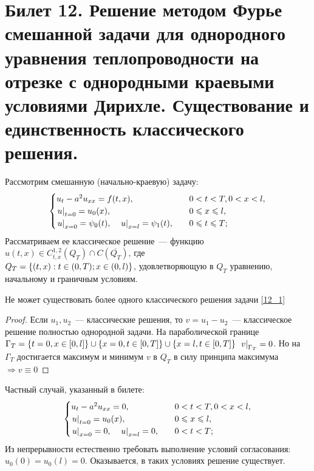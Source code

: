 \section{Билет 12. Решение методом Фурье смешанной задачи для однородного уравнения теплопроводности на отрезке с однородными краевыми условиями Дирихле. Существование и единственность классического решения.}
Рассмотрим смешанную (начально-краевую) задачу:
\begin{equation} \label{12_1}
	\begin{cases}
		u_t - a^2u_{xx} = f(t,x), \quad &0 < t < T, 0 < x < l, \\
		\left. u\right|_{t=0} = u_0(x), \quad & 0 \leqslant x \leqslant l, \\
		\left. u\right|_{x=0} = \psi_0(t), \quad \left. u\right|_{x=l} = \psi_1(t), \quad & 0 \leqslant t \leqslant T;
	\end{cases}
\end{equation}
Рассматриваем ее классическое решение~--- функцию $u(t,x) \in C^{1,2}_{t,x}(Q_T) \cap C(\overline{Q_T})$, где \\ $Q_T = \left\{(t,x) : t \in (0,T); x \in (0,l)\right\}$, удовлетворяющую в $Q_T$ уравнению, начальному и граничным условиям.
\begin{theorem}[Единственности]
	Не может существовать более одного классического решения задачи \ref{12_1}
\end{theorem}
\begin{proof}
	Если $u_1, u_2$~--- классические решения, то $v = u_1 - u_2$~--- классическое решение полностью однородной задачи. На параболической границе $\Gamma_T = \left\{t=0, x \in \left[0,l\right]\right\} \cup \left\{x=0, t \in \left[0,T\right]\right\} \cup \left\{x=l, t \in \left[0,T\right]\right\}$ $\left. v\right|_{\Gamma_T} = 0$. Но на $\Gamma_T$ достигается максимум и минимум $v$ в $Q_T$ в силу принципа максимума $\Rightarrow v \equiv 0$
\end{proof}

Частный случай, указанный в билете:
\begin{equation*}
	\begin{cases}
		u_t - a^2u_{xx} = 0, \quad & 0 < t < T, 0 < x < l, \\
		\left. u\right|_{t=0} = u_0(x), \quad & 0 \leqslant x \leqslant l, \\
		\left. u\right|_{x=0} = 0, \quad \left. u\right|_{x=l} = 0, \quad & 0 < t < T;
	\end{cases}
\end{equation*}
Из непрерывности естественно требовать выполнение условий согласования: $u_0(0) = u_0(l) = 0$. Оказывается, в таких условиях решение существует.

